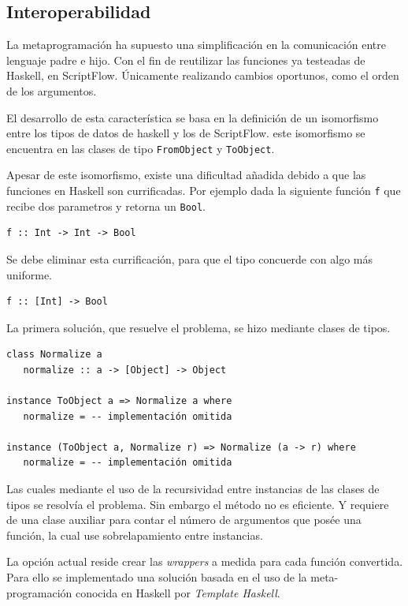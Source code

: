 \documentclass[11pt]{article}
\begin{document}
\subsection{Interoperabilidad}
\label{sec:org189a1dd}

La metaprogramación ha supuesto una simplificación en la comunicación entre lenguaje padre e hijo. Con el fin de reutilizar las funciones
ya testeadas de Haskell, en ScriptFlow. Únicamente realizando cambios oportunos, como el orden de los argumentos.

El desarrollo de esta característica se basa en la definición de un isomorfismo entre los tipos de datos de haskell y los de ScriptFlow.
este isomorfismo se encuentra en las clases de tipo \texttt{FromObject} y \texttt{ToObject}.

Apesar de este isomorfismo, existe una dificultad añadida debido a que las funciones en Haskell son currificadas. Por ejemplo dada la siguiente
función \texttt{f} que recibe dos parametros y retorna un \texttt{Bool}.

\begin{verbatim}
f :: Int -> Int -> Bool
\end{verbatim}

Se debe eliminar esta currificación, para que el tipo concuerde con algo más uniforme.

\begin{verbatim}
f :: [Int] -> Bool
\end{verbatim}

La primera solución, que resuelve el problema, se hizo mediante clases de tipos.
\begin{verbatim}
class Normalize a
   normalize :: a -> [Object] -> Object

instance ToObject a => Normalize a where
   normalize = -- implementación omitida

instance (ToObject a, Normalize r) => Normalize (a -> r) where
   normalize = -- implementación omitida
\end{verbatim}

Las cuales mediante el uso de la recursividad entre instancias de las clases de tipos se resolvía el problema. Sin embargo
el método no es eficiente. Y requiere de una clase auxiliar para contar el número de argumentos que posée una función, la cual use
sobrelapamiento entre instancias.

La opción actual reside crear las \emph{wrappers} a medida para cada función convertida. Para ello se implementado una solución
basada en el uso de la meta-programación conocida en Haskell por \emph{Template Haskell}.
\end{document}
